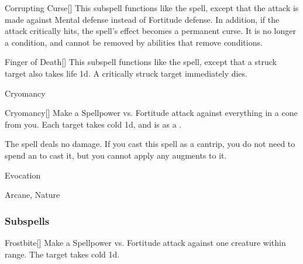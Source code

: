 \begin{ability}[\nth{6}]{Corrupting Curse}[]
This subspell functions like the  spell, except that the attack is made against Mental defense instead of Fortitude defense.
In addition, if the attack critically hits, the spell's effect becomes a permanent curse.
It is no longer a condition, and cannot be removed by abilities that remove conditions.
\end{ability}
\vspace{0.25em}


\begin{ability}[\nth{7}]{Finger of Death}[]
This subspell functions like the  spell, except that a struck target also takes life  \plus1d.
A critically struck target immediately dies.
\end{ability}
\vspace{0.25em}

\newpage
\begin{spellsection}{Cryomancy}

\begin{spellheader}
\end{spellheader}


\begin{ability}{Cryomancy}[]
Make a Spellpower vs. Fortitude attack against everything in a \areamed cone from you.
\hit Each target takes cold  \minus1d, and is  as a .
\end{ability}



 The spell deals no damage. If you cast this spell as a cantrip,
you do not need to spend an  to cast it,
but you cannot apply any augments to it.


 Evocation

 Arcane, Nature
\end{spellsection}


\subsubsection{Subspells}


\begin{ability}[\nth{1}]{Frostbite}[]
Make a Spellpower vs. Fortitude attack against one creature within \rngmed range.
\hit The target takes cold  \plus1d.
\end{ability}
\vspace{0.25em}


